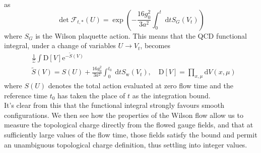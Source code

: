 \documentclass[a4paper,10pt]{article}
\begin{document}
as
\begin{equation}
\operatorname{det} \mathcal{F}_{t, *}(U) = \exp\left( -\frac{16 g_{0}^{2}}{3 a^{2}} \int_{0}^{t} \mathrm{~d} t S_{G}\left(V_{t}\right) \right)
\end{equation}
where $S_{G}$ is the Wilson plaquette action. This means that the QCD functional integral, under a change of variables $U\rightarrow V_t$, becomes
\begin{equation}
\begin{aligned}
&\frac{1}{\mathcal{Z}} \int \mathrm{D}[V] \mathrm{e}^{-\tilde{S}(V)} \\
&\tilde{S}(V)=S(U)+\frac{16 g_{0}^{2}}{3 a^{2}} \int_{0}^{t_{0}} \mathrm{~d} t S_{\mathrm{w}}\left(V_{t}\right), \quad \mathrm{D}[V]=\prod_{x, \mu} \mathrm{d} V(x, \mu)
\end{aligned}
\end{equation}
where $S(U)$ denotes the total action evaluated at zero flow time and the reference time $t_0$ has taken the place of $t$ as the integration bound.\\It's clear from this that the functional integral strongly favours smooth configurations.
We then see how the properties of the Wilson flow allow us to measure the topological charge directly from the flowed gauge fields, and that at sufficiently large values of the flow time, those fields satisfy the bound and permit an unambiguous topological charge definition, thus settling into integer values.
\end{document}
